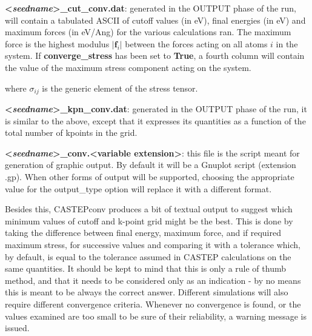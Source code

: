 \documentclass[10pt]{article}
\begin{document}
\textbf{\textless \textit{seedname}\textgreater\_cut\_conv.dat}: generated in the OUTPUT phase of the run, will contain a tabulated ASCII of cutoff values (in eV), final energies (in eV) and maximum forces (in eV/Ang) for the various calculations ran. The maximum force is the highest modulus $|\mathbf{f}_i|$ between the forces acting on all atoms $i$ in the system. If \textbf{converge\_stress} has been set to \textbf{True}, a fourth column will contain the value of the maximum stress component acting on the system.

where $\sigma_{ij}$ is the generic element of the stress tensor.

\textbf{\textless \textit{seedname}\textgreater\_kpn\_conv.dat}: generated in the OUTPUT phase of the run, it is similar to the above, except that it expresses its quantities as a function of the total number of kpoints in the grid.

\textbf{\textless \textit{seedname}\textgreater\_conv.\textless variable extension\textgreater}: this file is the script meant for generation of graphic output. By default it will be a Gnuplot script (extension .gp). When other forms of output will be supported, choosing the appropriate value for the output\_type option will replace it with a different format.

Besides this, CASTEPconv produces a bit of textual output to suggest which minimum values of cutoff and k-point grid might be the best. This is done by taking the difference between final energy, maximum force, and if required maximum stress, for successive values and comparing it with a tolerance which, by default, is equal to the tolerance assumed in CASTEP calculations on the same quantities. It should be kept to mind that this is only a rule of thumb method, and that it needs to be considered only as an indication - by no means this is meant to be always the correct answer. Different simulations will also require different convergence criteria. Whenever no convergence is found, or the values examined are too small to be sure of their reliability, a warning message is issued.
\end{document}
